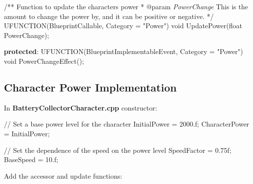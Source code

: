 \documentclass[
  letterpaper,
  DIV=11,
  numbers=noendperiod]{scrartcl}
\newenvironment{Shaded}{\begin{snugshade}}{\end{snugshade}}
\newcommand{\AnnotationTok}[1]{\textcolor[rgb]{0.37,0.37,0.37}{#1}}
\newcommand{\BuiltInTok}[1]{\textcolor[rgb]{0.00,0.23,0.31}{#1}}
\newcommand{\CommentTok}[1]{\textcolor[rgb]{0.37,0.37,0.37}{#1}}
\newcommand{\CommentVarTok}[1]{\textcolor[rgb]{0.37,0.37,0.37}{\textit{#1}}}
\newcommand{\DataTypeTok}[1]{\textcolor[rgb]{0.68,0.00,0.00}{#1}}
\newcommand{\FloatTok}[1]{\textcolor[rgb]{0.68,0.00,0.00}{#1}}
\newcommand{\KeywordTok}[1]{\textcolor[rgb]{0.00,0.23,0.31}{\textbf{#1}}}
\newcommand{\NormalTok}[1]{\textcolor[rgb]{0.00,0.23,0.31}{#1}}
\newcommand{\OperatorTok}[1]{\textcolor[rgb]{0.37,0.37,0.37}{#1}}
\newcommand{\StringTok}[1]{\textcolor[rgb]{0.13,0.47,0.30}{#1}}
\begin{document}
\begin{Shaded}
\begin{Highlighting}[]
    \CommentTok{/**}
\CommentTok{    Function to update the character\textquotesingle{}s power }
\CommentTok{    * }\AnnotationTok{@param}\CommentTok{ }\CommentVarTok{PowerChange}\CommentTok{ This is the amount to change the power by, and it can be positive or negative.}
\CommentTok{    */}
\NormalTok{    UFUNCTION}\OperatorTok{(}\NormalTok{BlueprintCallable}\OperatorTok{,}\NormalTok{ Category }\OperatorTok{=} \StringTok{"Power"}\OperatorTok{)}
    \DataTypeTok{void}\NormalTok{ UpdatePower}\OperatorTok{(}\DataTypeTok{float}\NormalTok{ PowerChange}\OperatorTok{);}

\KeywordTok{protected}\OperatorTok{:}
\NormalTok{    UFUNCTION}\OperatorTok{(}\NormalTok{BlueprintImplementableEvent}\OperatorTok{,}\NormalTok{ Category }\OperatorTok{=} \StringTok{"Power"}\OperatorTok{)}
    \DataTypeTok{void}\NormalTok{ PowerChangeEffect}\OperatorTok{();}
\end{Highlighting}
\end{Shaded}

\subsection{Character Power
Implementation}\label{character-power-implementation}

In \textbf{BatteryCollectorCharacter.cpp} constructor:

\begin{Shaded}
\begin{Highlighting}[]
\CommentTok{// Set a base power level for the character}
\NormalTok{InitialPower }\OperatorTok{=} \FloatTok{2000.}\BuiltInTok{f}\OperatorTok{;}
\NormalTok{CharacterPower }\OperatorTok{=}\NormalTok{ InitialPower}\OperatorTok{;}

\CommentTok{// Set the dependence of the speed on the power level}
\NormalTok{SpeedFactor }\OperatorTok{=} \FloatTok{0.75}\BuiltInTok{f}\OperatorTok{;}
\NormalTok{BaseSpeed }\OperatorTok{=} \FloatTok{10.}\BuiltInTok{f}\OperatorTok{;}
\end{Highlighting}
\end{Shaded}

Add the accessor and update functions:
\end{document}

